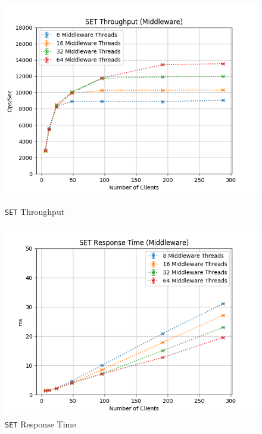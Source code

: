 \documentclass[11pt,a4paper]{article}
\begin{document}
\begin{figure}[H]
	\centering
	\captionsetup{width=0.4\textwidth}
    \begin{minipage}{0.5\textwidth}
        \centering
        \includegraphics[width=\textwidth]{../illustrations/plots/3_1_full_system_write/1-0/middleware_set_tp_s.png}
        \caption{\texttt{SET} Throughput}
        \label{fig:full_system_write_set_tp_mw}
    \end{minipage}\hfill
    \begin{minipage}{0.5\textwidth}
        \centering
        \includegraphics[width=\textwidth]{../illustrations/plots/3_1_full_system_write/1-0/middleware_set_rt_ms.png}
        \caption{\texttt{SET} Response Time}
        \label{fig:full_system_write_set_rt_mw}
    \end{minipage}
\end{figure}
\end{document}
